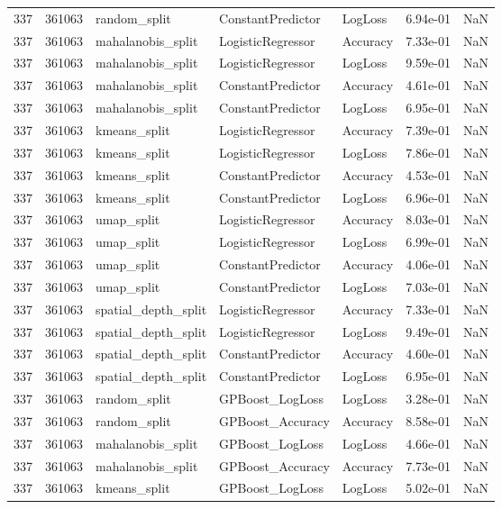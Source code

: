 \begin{tabular}{rrlllrr}
337 & 361063 & random\_split & ConstantPredictor & LogLoss & 6.94e-01 & NaN \\
337 & 361063 & mahalanobis\_split & LogisticRegressor & Accuracy & 7.33e-01 & NaN \\
337 & 361063 & mahalanobis\_split & LogisticRegressor & LogLoss & 9.59e-01 & NaN \\
337 & 361063 & mahalanobis\_split & ConstantPredictor & Accuracy & 4.61e-01 & NaN \\
337 & 361063 & mahalanobis\_split & ConstantPredictor & LogLoss & 6.95e-01 & NaN \\
337 & 361063 & kmeans\_split & LogisticRegressor & Accuracy & 7.39e-01 & NaN \\
337 & 361063 & kmeans\_split & LogisticRegressor & LogLoss & 7.86e-01 & NaN \\
337 & 361063 & kmeans\_split & ConstantPredictor & Accuracy & 4.53e-01 & NaN \\
337 & 361063 & kmeans\_split & ConstantPredictor & LogLoss & 6.96e-01 & NaN \\
337 & 361063 & umap\_split & LogisticRegressor & Accuracy & 8.03e-01 & NaN \\
337 & 361063 & umap\_split & LogisticRegressor & LogLoss & 6.99e-01 & NaN \\
337 & 361063 & umap\_split & ConstantPredictor & Accuracy & 4.06e-01 & NaN \\
337 & 361063 & umap\_split & ConstantPredictor & LogLoss & 7.03e-01 & NaN \\
337 & 361063 & spatial\_depth\_split & LogisticRegressor & Accuracy & 7.33e-01 & NaN \\
337 & 361063 & spatial\_depth\_split & LogisticRegressor & LogLoss & 9.49e-01 & NaN \\
337 & 361063 & spatial\_depth\_split & ConstantPredictor & Accuracy & 4.60e-01 & NaN \\
337 & 361063 & spatial\_depth\_split & ConstantPredictor & LogLoss & 6.95e-01 & NaN \\
337 & 361063 & random\_split & GPBoost\_LogLoss & LogLoss & 3.28e-01 & NaN \\
337 & 361063 & random\_split & GPBoost\_Accuracy & Accuracy & 8.58e-01 & NaN \\
337 & 361063 & mahalanobis\_split & GPBoost\_LogLoss & LogLoss & 4.66e-01 & NaN \\
337 & 361063 & mahalanobis\_split & GPBoost\_Accuracy & Accuracy & 7.73e-01 & NaN \\
337 & 361063 & kmeans\_split & GPBoost\_LogLoss & LogLoss & 5.02e-01 & NaN \\

\end{tabular}
